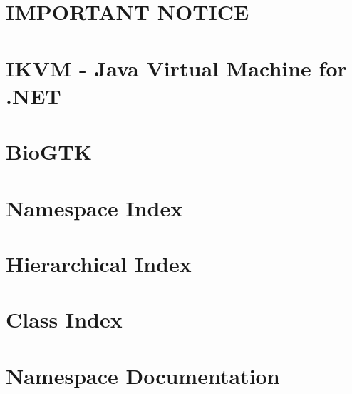 \documentclass[twoside]{book}
\newcommand{\+}{\discretionary{\mbox{\scriptsize$\hookleftarrow$}}{}{}}
\begin{document}
\chapter{IMPORTANT NOTICE}
\label{md__f___shared__bio__bio_g_t_k__bio_g_t_k_bin_x64__release_net6_0_ikvm_win81_arm__l_i_c_e_n_s_e}

\chapter{IKVM -\/ Java Virtual Machine for .NET}
\label{md__f___shared__bio__bio_g_t_k__bio_g_t_k_bin_x64__release_net6_0_ikvm_win81_arm__r_e_a_d_m_e}

\chapter{Bio\+GTK}
\label{md__f___shared__bio__bio_g_t_k__bio_g_t_k__r_e_a_d_m_e}

\chapter{Namespace Index}

\chapter{Hierarchical Index}

\chapter{Class Index}

\chapter{Namespace Documentation}



\end{document}
